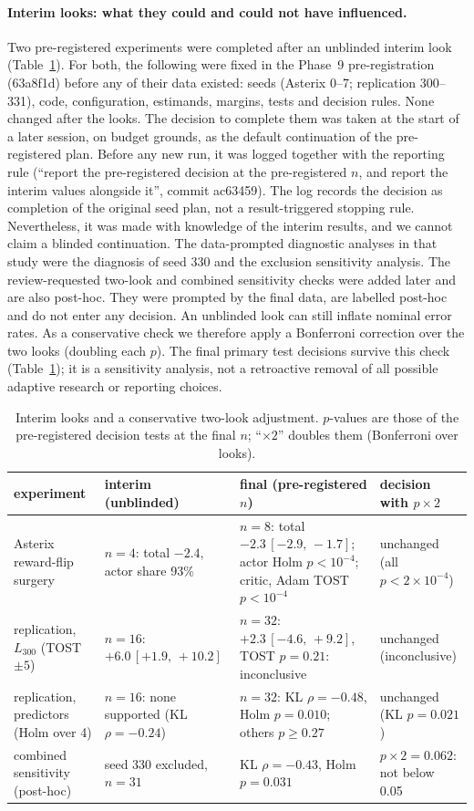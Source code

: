 \documentclass[10pt]{article} %
\newcommand{\ci}[2]{\,[#1,\,#2]}
\begin{document}
\paragraph{Interim looks: what they could and could not have influenced.}\label{app:interim}
Two pre-registered experiments were completed after an unblinded interim look (Table~\ref{tab:interim}). For both, the following were fixed in the Phase~9 pre-registration (63a8f1d) before any of their data existed: seeds (Asterix 0--7; replication 300--331), code, configuration, estimands, margins, tests and decision rules. None changed after the looks. The decision to complete them was taken at the start of a later session, on budget grounds, as the default continuation of the pre-registered plan. Before any new run, it was logged together with the reporting rule (``report the pre-registered decision at the pre-registered $n$, and report the interim values alongside it'', commit ac63459). The log records the decision as completion of the original seed plan, not a result-triggered stopping rule. Nevertheless, it was made with knowledge of the interim results, and we cannot claim a blinded continuation. The data-prompted diagnostic analyses in that study were the diagnosis of seed 330 and the exclusion sensitivity analysis. The review-requested two-look and combined sensitivity checks were added later and are also post-hoc. They were prompted by the final data, are labelled post-hoc and do not enter any decision. An unblinded look can still inflate nominal error rates. As a conservative check we therefore apply a Bonferroni correction over the two looks (doubling each $p$). The final primary test decisions survive this check (Table~\ref{tab:interim}); it is a sensitivity analysis, not a retroactive removal of all possible adaptive research or reporting choices.

\begin{table}[h]
\centering
\caption{Interim looks and a conservative two-look adjustment. $p$-values are those of the pre-registered decision tests at the final $n$; ``$\times2$'' doubles them (Bonferroni over looks).}
\label{tab:interim}
\scriptsize
\begin{tabular}{p{2.6cm}p{3.6cm}p{3.6cm}p{3.6cm}}
\toprule
experiment & interim (unblinded) & final (pre-registered $n$) & decision with $p\times2$ \\
\midrule
Asterix reward-flip surgery & $n=4$: total $-2.4$, actor share 93\% & $n=8$: total $-2.3\ci{-2.9}{-1.7}$; actor Holm $p<10^{-4}$; critic, Adam TOST $p<10^{-4}$ & unchanged (all $p<2\times10^{-4}$) \\
replication, $L_{300}$ (TOST $\pm5$) & $n=16$: $+6.0\ci{+1.9}{+10.2}$ & $n=32$: $+2.3\ci{-4.6}{+9.2}$, TOST $p=0.21$: inconclusive & unchanged (inconclusive) \\
replication, predictors (Holm over 4) & $n=16$: none supported (KL $\rho=-0.24$) & $n=32$: KL $\rho=-0.48$, Holm $p=0.010$; others $p\geq0.27$ & unchanged (KL $p=0.021$) \\
combined sensitivity (post-hoc) & seed 330 excluded, $n=31$ & KL $\rho=-0.43$, Holm $p=0.031$ & $p\times2=0.062$: not below 0.05 \\
\bottomrule
\end{tabular}
\end{table}
\end{document}
